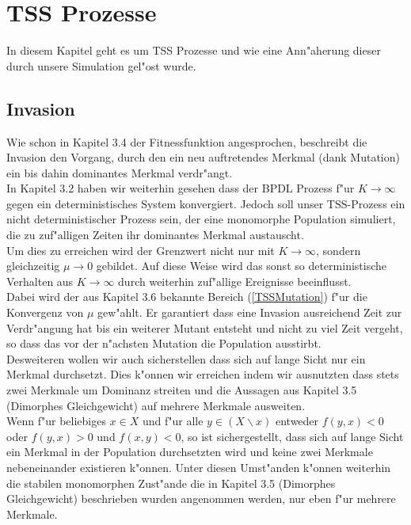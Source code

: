 \documentclass[11pt, a4paper, german]{article}
\theoremstyle{plain}
\begin{document}
	
\clearpage
\section{TSS Prozesse}
In diesem Kapitel geht es um TSS Prozesse und wie eine Ann"aherung dieser durch unsere Simulation gel"ost wurde.
	\subsection{Invasion}
	Wie schon in Kapitel 3.4 der Fitnessfunktion angesprochen, beschreibt die Invasion den Vorgang, durch den ein neu auftretendes Merkmal (dank Mutation) ein bis dahin dominantes Merkmal verdr"angt.\\
	In Kapitel 3.2 haben wir weiterhin gesehen dass der BPDL Prozess f"ur $ K \to \infty $ gegen ein deterministisches System konvergiert. Jedoch soll unser TSS-Prozess ein nicht deterministischer Prozess sein, der eine monomorphe Population simuliert, die zu zuf"alligen Zeiten ihr dominantes Merkmal austauscht.\\
	Um dies zu erreichen wird der Grenzwert nicht nur mit $ K \to \infty $, sondern gleichzeitig $ \mu \to 0 $ gebildet. Auf diese Weise wird das sonst so deterministische Verhalten aus $ K \to \infty $ durch weiterhin zuf"allige Ereignisse beeinflusst.\\
	Dabei wird der aus Kapitel 3.6 bekannte Bereich (\ref{TSSMutation}) f"ur die Konvergenz von $ \mu $ gew"ahlt. Er garantiert dass eine Invasion ausreichend Zeit zur Verdr"angung hat bis ein weiterer Mutant entsteht und nicht zu viel Zeit vergeht, so dass das vor der n"achsten Mutation die Population ausstirbt.\\
	Desweiteren wollen wir auch sicherstellen dass sich auf lange Sicht nur ein Merkmal durchsetzt. Dies k"onnen wir erreichen indem wir ausnutzten dass stets zwei Merkmale um Dominanz streiten und die Aussagen aus Kapitel 3.5 (Dimorphes Gleichgewicht) auf mehrere Merkmale ausweiten.\\
	Wenn f"ur beliebiges $ x \in X $ und f"ur alle $ y \in (X\backslash x) $ entweder $ f(y,x) < 0 $ oder $ f(y,x) > 0 $ und $ f(x,y) < 0 $, so ist sichergestellt, dass sich auf lange Sicht ein Merkmal in der Population durchsetzten wird und keine zwei Merkmale nebeneinander existieren k"onnen. Unter diesen Umst"anden k"onnen weiterhin die stabilen monomorphen Zust"ande die in Kapitel 3.5 (Dimorphes Gleichgewicht) beschrieben wurden angenommen werden, nur eben f"ur mehrere Merkmale.\\
	
\end{document}
